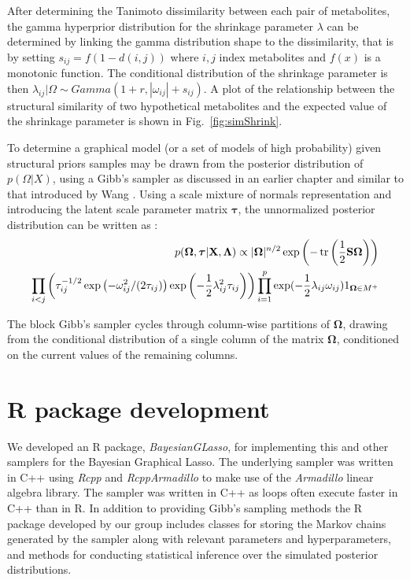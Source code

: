 \begin{DoubleSpace}
After determining the Tanimoto dissimilarity between each pair of metabolites, the gamma hyperprior distribution for the shrinkage parameter $\lambda$ can be determined by linking the gamma distribution shape to the dissimilarity, that is by setting $s_{ij}=f(1-d(i,j))$ where $i,j$ index metabolites and $f(x)$ is a monotonic function. The conditional distribution of the shrinkage parameter is then $\lambda_{ij} |\Omega \sim Gamma(1+r,|\omega_{ij} |+s_{ij} )$. A plot of the relationship between the structural similarity of two hypothetical metabolites and the expected value of the shrinkage parameter is shown in  Fig.~\ref{fig:simShrink}. 

To determine a graphical model (or a set of models of high probability) given structural priors samples may be drawn from the posterior distribution of $p(\Omega|X)$, using a Gibb’s sampler as discussed in an earlier chapter and similar to that introduced by Wang \cite{wang2012}. Using a scale mixture of normals representation  \cite{west1987} and introducing the latent scale parameter matrix $\boldsymbol{\tau}$, the unnormalized posterior distribution can be written as \cite{wang2012}: 
\begin{align}
\begin{split}
	p(\boldsymbol{\Omega}, \boldsymbol{\tau}|\textbf{X}, \boldsymbol{\Lambda}) \propto |\boldsymbol{\Omega}| ^{n/2} \exp \left(-\operatorname{tr} \left(\frac{1}{2}\textbf{S}\boldsymbol{\Omega} \right) \right)\\ \prod_{i<j} \left(\tau_{ij}^{-1/2} \exp \left(-\omega_{ij}^2 / (2\tau_{ij}) \right) \exp \left(-\frac{1}{2} \lambda_{ij}^2 \tau_{ij}\right)\right)  \prod_{i=1}^{p} \exp(-\frac{1}{2} \lambda_{ij} \omega_{ij}) 1_{\boldsymbol{\Omega}\in M^+}
\end{split}
\end{align}

The block Gibb’s sampler cycles through column-wise partitions of $\boldsymbol{\Omega}$, drawing from the conditional distribution of a single column of the matrix $\boldsymbol{\Omega}$, conditioned on the current values of the remaining columns.

\section{R package development} 
 We developed an R package, \emph{BayesianGLasso}, for implementing this and other samplers for the Bayesian Graphical Lasso. The underlying sampler was written in C++ using \emph{Rcpp} \cite{eddelbuettel2011,eddelbuettel2013} and \emph{RcppArmadillo} \cite{eddelbuettel2014} to make use of the \emph{Armadillo} \cite{sanderson2016} linear algebra library. The sampler was written in C++ as loops often execute faster in C++ than in R. In addition to providing Gibb’s sampling methods the R package developed by our group includes classes for storing the Markov chains generated by the sampler along with relevant parameters and hyperparameters, and methods for conducting statistical inference over the simulated posterior distributions.
 

\end{DoubleSpace}
